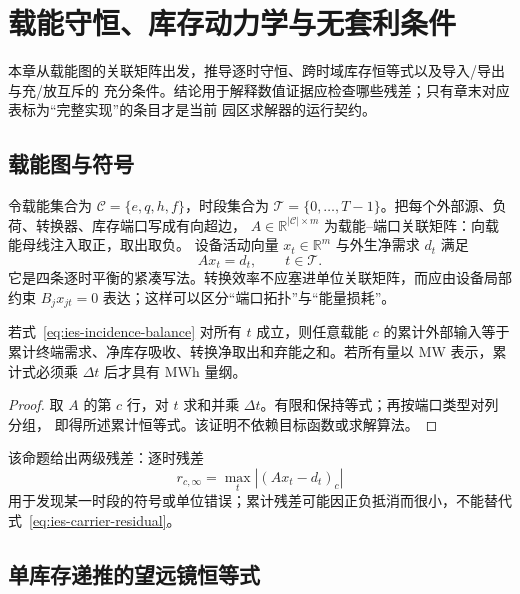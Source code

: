 \section{载能守恒、库存动力学与无套利条件}

\begin{theorynote}
本章从载能图的关联矩阵出发，推导逐时守恒、跨时域库存恒等式以及导入/导出与充/放互斥的
充分条件。结论用于解释数值证据应检查哪些残差；只有章末对应表标为“完整实现”的条目才是当前
园区求解器的运行契约。
\end{theorynote}

\subsection{载能图与符号}

令载能集合为 $\mathcal C=\{e,q,h,f\}$，时段集合为
$\mathcal T=\{0,\ldots,T-1\}$。把每个外部源、负荷、转换器、库存端口写成有向超边，
$A\in\mathbb R^{|\mathcal C|\times m}$ 为载能--端口关联矩阵：向载能母线注入取正，取出取负。
设备活动向量 $x_t\in\mathbb R^m$ 与外生净需求 $d_t$ 满足
\begin{equation}
  A x_t=d_t,\qquad t\in\mathcal T .
  \label{eq:ies-incidence-balance}
\end{equation}
它是四条逐时平衡的紧凑写法。转换效率不应塞进单位关联矩阵，而应由设备局部约束
$B_jx_{jt}=0$ 表达；这样可以区分“端口拓扑”与“能量损耗”。

\begin{proposition}[逐时守恒的全时域恒等式]
若式~\eqref{eq:ies-incidence-balance} 对所有 $t$ 成立，则任意载能 $c$ 的累计外部输入等于
累计终端需求、净库存吸收、转换净取出和弃能之和。若所有量以 MW 表示，累计式必须乘
$\Delta t$ 后才具有 MWh 量纲。
\end{proposition}
\begin{proof}
取 $A$ 的第 $c$ 行，对 $t$ 求和并乘 $\Delta t$。有限和保持等式；再按端口类型对列分组，
即得所述累计恒等式。该证明不依赖目标函数或求解算法。
\end{proof}

该命题给出两级残差：逐时残差
\begin{equation}
 r_{c,\infty}=\max_t\left|(Ax_t-d_t)_c\right|
 \label{eq:ies-carrier-residual}
\end{equation}
用于发现某一时段的符号或单位错误；累计残差可能因正负抵消而很小，不能替代
式~\eqref{eq:ies-carrier-residual}。

\subsection{单库存递推的望远镜恒等式}

